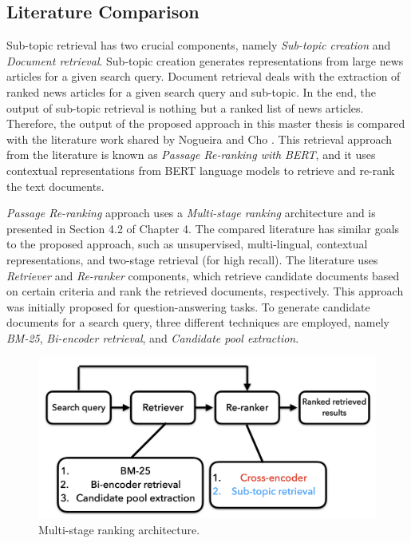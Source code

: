 \subsection{Literature Comparison}

Sub-topic retrieval has two crucial components, namely \textit{Sub-topic creation} and \textit{Document retrieval}. Sub-topic creation generates representations from large news articles for a given search query. Document retrieval deals with the extraction of ranked news articles for a given search query and sub-topic. In the end, the output of sub-topic retrieval is nothing but a ranked list of news articles. Therefore, the output of the proposed approach in this master thesis is compared with the literature work shared by Nogueira and Cho \cite{nogueira2019passage}. This retrieval approach from the literature is known as \textit{Passage Re-ranking with \ac{BERT}}, and it uses contextual representations from \ac{BERT} language models to retrieve and re-rank the text documents.



\textit{Passage Re-ranking} approach uses a \textit{Multi-stage ranking} architecture and is presented in Section 4.2 of Chapter 4. The compared literature has similar goals to the proposed approach, such as unsupervised, multi-lingual, contextual representations, and two-stage retrieval (for high recall). The literature uses \textit{Retriever} and \textit{Re-ranker} components, which retrieve candidate documents based on certain criteria and rank the retrieved documents, respectively. This approach was initially proposed for question-answering tasks. To generate candidate documents for a search query, three different techniques are employed, namely \textit{BM-25}, \textit{Bi-encoder retrieval}, and \textit{Candidate pool extraction}.


\begin{figure}[h]
	\centering
	\includegraphics[width=.9\textwidth]{images/thesis_images/literature_review.png}
	\caption{Multi-stage ranking architecture. \label{fig:literature_review}}
\end{figure}

